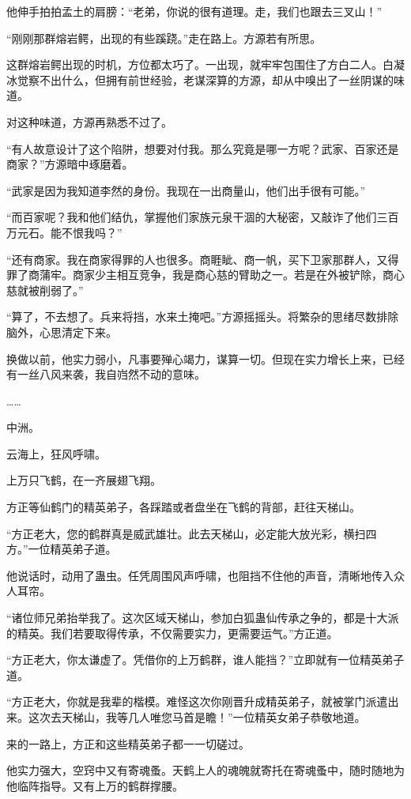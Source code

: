 \begin{this_body}
他伸手拍拍孟土的肩膀：“老弟，你说的很有道理。走，我们也跟去三叉山！”

“刚刚那群熔岩鳄，出现的有些蹊跷。”走在路上。方源若有所思。

这群熔岩鳄出现的时机，方位都太巧了。一出现，就牢牢包围住了方白二人。白凝冰觉察不出什么，但拥有前世经验，老谋深算的方源，却从中嗅出了一丝阴谋的味道。

对这种味道，方源再熟悉不过了。

“有人故意设计了这个陷阱，想要对付我。那么究竟是哪一方呢？武家、百家还是商家？”方源暗中琢磨着。

“武家是因为我知道李然的身份。我现在一出商量山，他们出手很有可能。”

“而百家呢？我和他们结仇，掌握他们家族元泉干涸的大秘密，又敲诈了他们三百万元石。能不恨我吗？”

“还有商家。我在商家得罪的人也很多。商睚眦、商一帆，买下卫家那群人，又得罪了商蒲牢。商家少主相互竞争，我是商心慈的臂助之一。若是在外被铲除，商心慈就被削弱了。”

“算了，不去想了。兵来将挡，水来土掩吧。”方源摇摇头。将繁杂的思绪尽数排除脑外，心思清定下来。

换做以前，他实力弱小，凡事要殚心竭力，谋算一切。但现在实力增长上来，已经有一丝八风来袭，我自岿然不动的意味。

……

中洲。

云海上，狂风呼啸。

上万只飞鹤，在一齐展翅飞翔。

方正等仙鹤门的精英弟子，各踩踏或者盘坐在飞鹤的背部，赶往天梯山。

“方正老大，您的鹤群真是威武雄壮。此去天梯山，必定能大放光彩，横扫四方。”一位精英弟子道。

他说话时，动用了蛊虫。任凭周围风声呼啸，也阻挡不住他的声音，清晰地传入众人耳帘。

“诸位师兄弟抬举我了。这次区域天梯山，参加白狐蛊仙传承之争的，都是十大派的精英。我们若要取得传承，不仅需要实力，更需要运气。”方正道。

“方正老大，你太谦虚了。凭借你的上万鹤群，谁人能挡？”立即就有一位精英弟子道。

“方正老大，你就是我辈的楷模。难怪这次你刚晋升成精英弟子，就被掌门派遣出来。这次去天梯山，我等几人唯您马首是瞻！”一位精英女弟子恭敬地道。

来的一路上，方正和这些精英弟子都一一切磋过。

他实力强大，空窍中又有寄魂蚤。天鹤上人的魂魄就寄托在寄魂蚤中，随时随地为他临阵指导。又有上万的鹤群撑腰。


\end{this_body}
